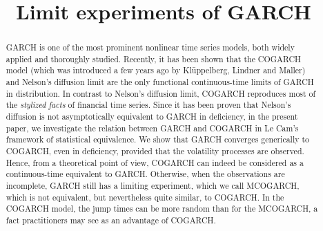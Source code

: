 \documentclass[number,citesort,seceqn,dvips]{arxbj}
\begin{document}
%
\begin{frontmatter}

\title{Limit experiments of GARCH}



%
\begin{abstract}
GARCH is one of the most prominent nonlinear time series models, both widely
applied and thoroughly studied. Recently, it has been shown that the
COGARCH model (which was introduced a
few years ago by Kl\"{u}ppelberg, Lindner and Maller) and Nelson's
diffusion limit are the only
functional continuous-time limits of GARCH in distribution. In contrast
to Nelson's
diffusion limit, COGARCH reproduces most of the \textit{stylized facts}
of financial time series.
Since it has been proven that Nelson's diffusion is not
asymptotically equivalent to GARCH in deficiency, in
the present paper, we investigate the relation between GARCH and
COGARCH in Le Cam's
framework of statistical equivalence.
We show that GARCH converges generically to COGARCH, even in deficiency,
provided that the volatility processes are observed. Hence, from
a theoretical point of view, COGARCH can indeed be considered as
a continuous-time equivalent to GARCH. Otherwise, when the observations
are incomplete, GARCH still has a limiting experiment, which we call MCOGARCH,
which is not equivalent, but nevertheless quite similar, to COGARCH.
In the COGARCH model, the jump times can be more random than for the
MCOGARCH, a fact
practitioners may see as an advantage of COGARCH.
\end{abstract}

%
\begin{keyword}
\end{keyword}

\end{frontmatter}
%
\end{document}
